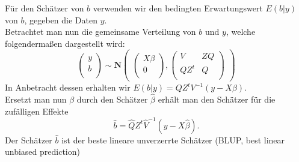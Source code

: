 \documentclass[%
thesis=student,%
coverpage=false,%
titlepage=false,%
headmarks=true, %
german,%
font=libertine, %
math=newpxtx, %
BCOR=5mm,%
coverBCOR=11mm%
]{tumbook}
\theoremstyle{break}
\begin{document}
Für den Schätzer von $b$ verwenden wir den bedingten Erwartungswert $E(b|y)$ von $b$, gegeben die Daten $y$. \\
Betrachtet man nun die gemeinsame Verteilung von $b$ und $y$, welche folgendermaßen dargestellt wird:
$$\begin{pmatrix}
	y \\
	b \\
\end{pmatrix}
\sim
\mathbf{N}
\begin{pmatrix}
	\begin{pmatrix}
		X\beta \\
		0 \\
	\end{pmatrix},
	\begin{pmatrix}
		V & Z Q \\
		Q Z^t & Q \\
	\end{pmatrix}
\end{pmatrix}$$
In Anbetracht dessen erhalten wir $E(b|y) = Q Z^tV^{-1}(y-X\beta)$. \\
Ersetzt man nun $\beta$ durch den Schätzer $\hat{\beta}$ erhält man den Schätzer für die zufälligen Effekte $$\hat{b} = \hat{Q} Z^t\hat{V}^{-1}(y-X\hat{\beta}).$$ Der Schätzer $\hat{b}$ ist der beste lineare unverzerrte Schätzer (BLUP, best linear unbiased prediction)\\
\end{document}
